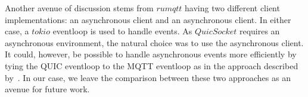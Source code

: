 Another avenue of discussion stems from $rumqtt$ having two different client implementations: an asynchronous client and an asynchronous client.
In either case, a $tokio$ eventloop is used to handle events.
As $QuicSocket$ requires an asynchronous environment, the natural choice was to use the asynchronous client.
It could, however, be possible to handle asynchronous events more efficiently by tying the QUIC eventloop to the MQTT eventloop as in the approach described by~\cite{kumar_implementation_2019}.
In our case, we leave the comparison between these two approaches as an avenue for future work.
